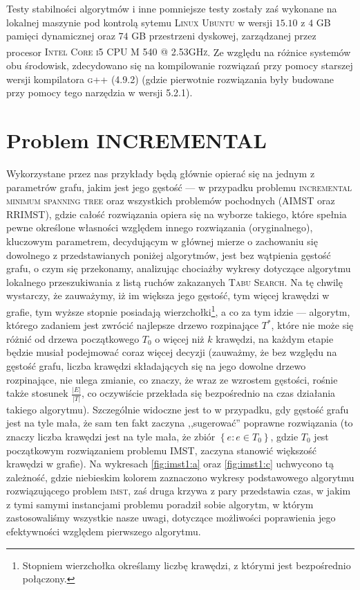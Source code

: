 Testy stabilności algorytmów i inne pomniejsze testy zostały zaś wykonane na lokalnej maszynie pod kontrolą sytemu \textsc{Linux Ubuntu} w wersji $15.10$ z $4$ \textsc{GB} pamięci dynamicznej oraz $74$ \textsc{GB} przestrzeni dyskowej, zarządzanej przez procesor \textsc{Intel\textsuperscript{\textregistered} Core\textsuperscript{\texttrademark} i5 CPU M 540  @ 2.53GHz}. Ze względu na różnice systemów obu środowisk, zdecydowano się na kompilowanie rozwiązań przy pomocy starszej wersji kompilatora \textsc{g++} (\textsc{4.9.2}) (gdzie pierwotnie rozwiązania były budowane przy pomocy tego narzędzia w wersji \textsc{5.2.1}).

\section{Problem INCREMENTAL}

Wykorzystane przez nas przykłady będą głównie opierać się na jednym z parametrów grafu, jakim jest jego gęstość --- w przypadku problemu \textsc{incremental minimum spanning tree} oraz wszystkich problemów pochodnych (\textsc{AIMST} oraz \textsc{RRIMST}), gdzie całość rozwiązania opiera się na wyborze takiego, które spełnia pewne określone własności względem innego rozwiązania (oryginalnego), kluczowym parametrem, decydującym w głównej mierze o zachowaniu się dowolnego z przedstawianych poniżej algorytmów, jest bez wątpienia gęstość grafu, o czym się przekonamy, analizując chociażby wykresy dotyczące algorytmu lokalnego przeszukiwania z listą ruchów zakazanych \textsc{Tabu Search}. Na tę chwilę wystarczy, że zauważymy, iż im większa jego gęstość, tym więcej krawędzi w grafie, tym wyższe stopnie posiadają wierzchołki\footnote{Stopniem wierzchołka określamy liczbę krawędzi, z którymi jest bezpośrednio połączony.}, a co za tym idzie --- algorytm, którego zadaniem jest zwrócić najlepsze drzewo rozpinające $T^{\ast}$, które nie może się różnić od drzewa początkowego $T_{0}$ o więcej niż $k$ krawędzi, na każdym etapie będzie musiał podejmować coraz więcej decyzji (zauważmy, że bez względu na gęstość grafu, liczba krawędzi składających się na jego dowolne drzewo rozpinające, nie ulega zmianie, co znaczy, że wraz ze wzrostem gęstości, rośnie także stosunek $\frac{\left| E \right|}{\left| T \right|}$, co oczywiście przekłada się bezpośrednio na czas działania takiego algorytmu). Szczególnie widoczne jest to w przypadku, gdy gęstość grafu jest na tyle mała, że sam ten fakt zaczyna ,,sugerować'' poprawne rozwiązania (to znaczy liczba krawędzi jest na tyle mała, że zbiór $\left\{ e : e \in T_{0} \right\}$, gdzie $T_{0}$ jest początkowym rozwiązaniem problemu \textsc{IMST}, zaczyna stanowić większość krawędzi w grafie). Na wykresach \ref{fig:imst1:a} oraz \ref{fig:imst1:c} uchwycono tą zależność, gdzie niebieskim kolorem zaznaczono wykresy podstawowego algorytmu rozwiązującego problem \textsc{imst}, zaś druga krzywa z pary przedstawia czas, w jakim z tymi samymi instancjami problemu poradził sobie algorytm, w którym zastosowaliśmy wszystkie nasze uwagi, dotyczące możliwości poprawienia jego efektywności względem pierwszego algorytmu.

